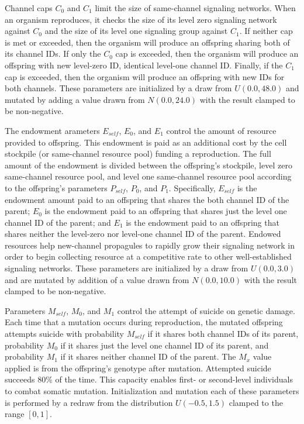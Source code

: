 Channel caps $C_0$ and $C_1$ limit the size of same-channel signaling networks.
When an organism reproduces, it checks the size of its level zero signaling network against $C_0$ and the size of its level one signaling group against $C_1$.
If neither cap is met or exceeded, then the organism will produce an offspring sharing both of its channel IDs.
If only the $C_0$ cap is exceeded, then the organism will produce an offspring with new level-zero ID, identical level-one channel ID.
Finally, if the $C_1$ cap is exceeded, then the organism will produce an offspring with new IDs for both channels.
These parameters are initialized by a draw from $U(0.0, 48.0)$ and mutated by adding a value drawn from $N(0.0,24.0)$ with the result clamped to be non-negative.

The endowment arameters $E_{self}$, $E_0$, and $E_1$ control the amount of resource provided to offspring.
This endowment is paid as an additional cost by the cell stockpile (or same-channel resource pool) funding a reproduction.
The full amount of the endowment is divided between the offspring's stockpile, level zero same-channel resource pool, and level one same-channel resource pool according to the offspring's parameters $P_{self}$, $P_0$, and $P_1$.
Specifically, $E_{self}$ is the endowment amount paid to an offspring that shares the both channel ID of the parent;
$E_0$ is the endowment paid to an offspring that shares just the level one channel ID of the parent;
and $E_1$ is the endowment paid to an offspring that shares neither the level-zero nor level-one channel ID of the parent.
Endowed resources help new-channel propagules to rapidly grow their signaling network in order to begin collecting resource at a competitive rate to other well-established signaling networks.
These parameters are initialized by a draw from $U(0.0, 3.0)$ and are mutated by addition of a value drawn from $N(0.0,10.0)$ with the result clamped to be non-negative.

Parameters $M_{self}$, $M_0$, and $M_1$ control the attempt of suicide on genetic damage.
Each time that a mutation occurs during reproduction, the mutated offspring attempts suicide with probability $M_{self}$ if it shares both channel IDs of its parent, probability $M_0$ if it shares just the level one channel ID of its parent, and probability $M_1$ if it shares neither channel ID of the parent.
The $M_x$ value applied is from the offspring's genotype after mutation.
Attempted suicide succeeds %
80\% of the time.
This capacity enables first- or second-level individuals to combat somatic mutation.
Initialization and mutation each of these parameters is performed by a redraw from the distribution $U(-0.5,1.5)$ clamped to the range $[0,1]$.


